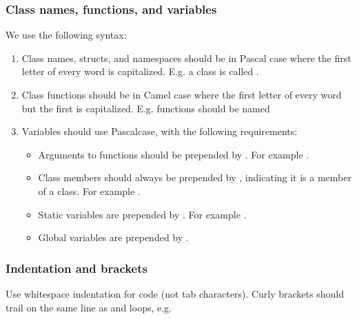 \documentclass[letterpaper,10pt,english]{sphinxmanual}
\begin{document}
\subsubsection{Class names, functions, and variables}
\label{\detokenize{Contrib/CodeStandard:class-names-functions-and-variables}}
We use the following syntax:
\begin{enumerate}
%
\item {} 
Class names, structs, and namespaces should be in Pascal case where the first letter of every word is capitalized.
E.g. a class is called .

\item {} 
Class functions should be in Camel case where the first letter of every word but the first is capitalized.
E.g. functions should be named 

\item {} 
Variables should use Pascal\sphinxhyphen{}case, with the following requirements:
\begin{itemize}
\item {} 
Arguments to functions should be prepended by . For example .

\item {} 
Class members should always be prepended by , indicating it is a member of a class. For example .

\item {} 
Static variables are prepended by . For example .

\item {} 
Global variables are prepended by \sphinxcode{\sphinxupquote{//}}.

\end{itemize}

\end{enumerate}


\subsubsection{Indentation and brackets}
\label{\detokenize{Contrib/CodeStandard:indentation-and-brackets}}
Use whitespace indentation for code (not tab characters).
Curly brackets should trail on the same line as  and  loops, e.g.
\end{document}
